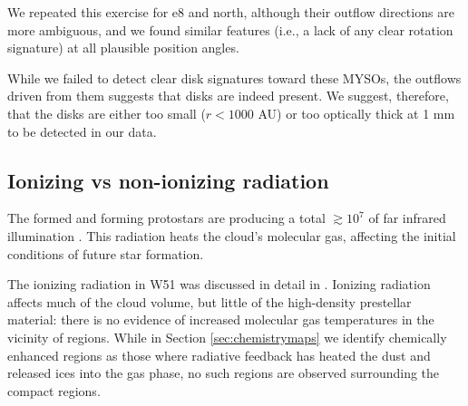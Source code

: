 \documentclass{emulateapj}
\begin{document}
We repeated this exercise for e8 and north, although their outflow directions
are more ambiguous, and we found similar features (i.e., a lack of any clear
rotation signature) at all plausible position angles.

While we failed to detect clear disk signatures toward these MYSOs, the
outflows driven from them suggests that disks are indeed present.  We suggest,
therefore, that the disks are either too small ($r<1000$ AU) or too optically
thick at 1 mm to be detected in our data.





\subsection{Ionizing vs non-ionizing radiation}
\label{sec:nonionizingradiation}
The formed and forming protostars are producing a total $\gtrsim10^7$ \lsun of
far infrared illumination \citep{Ginsburg2016b}.  This radiation heats the
cloud's molecular gas, affecting the initial conditions of future star
formation.

The ionizing radiation in W51 was discussed in detail in \citet{Ginsburg2016b}.
Ionizing radiation affects much of the cloud volume, but little of the
high-density prestellar material:  there is no evidence of increased molecular gas
temperatures in the vicinity of \hii regions.  While in Section
\ref{sec:chemistrymaps} we identify chemically enhanced regions as those where
radiative feedback has heated the dust and released ices into the gas phase, no
such regions are observed surrounding the compact \hii regions.

\end{document}
